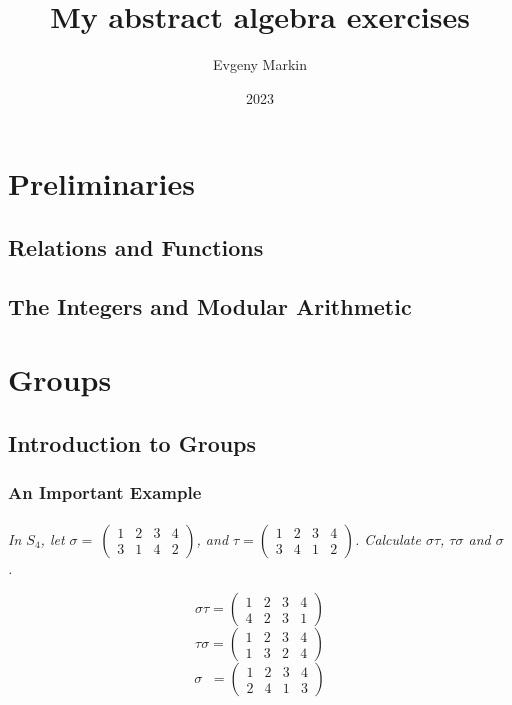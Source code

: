 \documentclass[11pt,oneside,titlepage]{book}
\title{My abstract algebra exercises}
\author{Evgeny Markin}
\date{2023}
\DeclareMathOperator \inv {^{-1}}
\begin{document}
\maketitle
\tableofcontents

\part{Preliminaries}

\chapter{Relations and Functions}

\chapter{The Integers and Modular Arithmetic}

\part{Groups}

\chapter{Introduction to Groups}

\section{An Important Example}

\subsection{}

\textit{In $S_4$, let $\sigma = \
  \begin{pmatrix}
    1 & 2 & 3 & 4 \\
    3 & 1 & 4 & 2
  \end{pmatrix}
  $,
  and $\tau =
  \begin{pmatrix}
    1 & 2 & 3 & 4 \\
    3 & 4 & 1 & 2
  \end{pmatrix}
  $. Calculate $\sigma \tau$, $\tau \sigma$ and $\sigma \inv$.
}

$$\sigma \tau =
\begin{pmatrix}
  1 & 2 & 3 & 4\\
  4 & 2 & 3 & 1 
\end{pmatrix}
$$
$$ \tau \sigma =
\begin{pmatrix}
  1 & 2 & 3 & 4\\
  1 & 3 & 2 & 4 
\end{pmatrix}
$$
$$\sigma \inv =
\begin{pmatrix}
  1 & 2 & 3 & 4 \\
  2 & 4 & 1 & 3
\end{pmatrix}
$$
\end{document}
